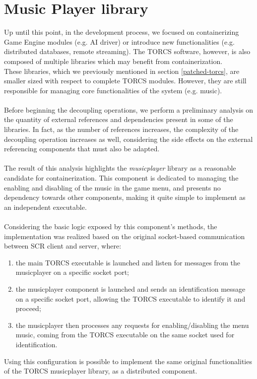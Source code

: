 \section{Music Player library}
Up until this point, in the development process, we focused on containerizing Game Engine modules (e.g. AI driver) or introduce new functionalities (e.g. distributed databases, remote streaming). The TORCS software, however, is also composed of multiple libraries which may benefit from containerization. \\
These libraries, which we previously mentioned in section \ref{patched-torcs}, are smaller sized with respect to complete TORCS modules. However, they are still responsible for managing core functionalities of the system (e.g. music). \\ \\
Before beginning the decoupling operations, we perform a preliminary analysis on the quantity of external references and dependencies present in some of the libraries. In fact, as the number of references increases, the complexity of the decoupling operation increases as well, considering the side effects on the external referencing components that must also be adapted. \\ \\
The result of this analysis highlights the \textit{musicplayer} library as a reasonable candidate for containerization. This component is dedicated to managing the enabling and disabling of the music in the game menu, and presents no dependency towards other components, making it quite simple to implement as an independent executable. \\ \\
Considering the basic logic exposed by this component's methods, the implementation was realized based on the original socket-based communication between SCR client and server, where:
\begin{enumerate}
	\item the main TORCS executable is launched and listen for messages from the musicplayer on a specific socket port;
	\item the musicplayer component is launched and sends an identification message on a specific socket port, allowing the TORCS executable to identify it and proceed;
	\item the musicplayer then processes any requests for enabling/disabling the menu music, coming from the TORCS executable on the same socket used for identification.
\end{enumerate}
Using this configuration is possible to implement the same original functionalities of the TORCS musicplayer library, as a distributed component.

